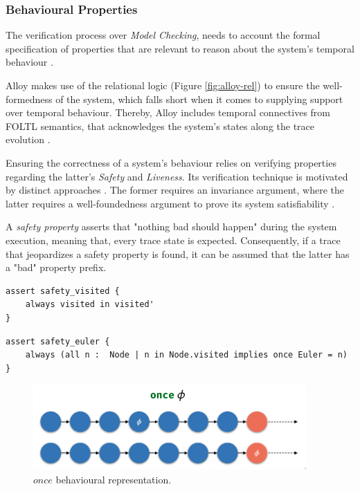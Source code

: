 \subsubsection{Behavioural Properties}

The verification process over \textit{Model Checking}, needs to account the formal specification of properties that are relevant to reason about the system's temporal behaviour \cite{baier2008principles} .

Alloy makes use of the relational logic (Figure \ref{fig:alloy-rel}) to ensure the well-formedness of the system, which falls short when it comes to supplying support over temporal behaviour. Thereby, Alloy includes temporal connectives from FOLTL semantics, that acknowledges the system's states along the trace evolution \cite{lwspecification, alloy-6, 9341085}.

Ensuring the correctness of a system's behaviour relies on verifying properties regarding the latter's \textit{Safety} and \textit{Liveness}. Its verification technique is motivated by distinct approaches \cite{kindler1994safety}. The former requires an invariance argument, where the latter requires a well-foundedness argument to prove its system satisfiability \cite{alpern1987recognizing}.

A \textit{safety property} asserts that "nothing bad should happen" during the system execution, meaning that, every trace state is expected. Consequently, if a trace that jeopardizes a safety property is found, it can be assumed that the latter has a "bad" property prefix. 

\begin{lstlisting}[title={\textit{Safety Property}: The relation visited can only evolve through time.}, otherkeywords = {always, assert, module, set, fact, iden, no, in, \=, \*, \+, \~, \-\>, \&, '}, floatplacement=H]
assert safety_visited {
    always visited in visited'
} 
\end{lstlisting}

\begin{lstlisting}[title={\textit{Safety Property}: If a node is visited, then once \textit{Euler} was 'inside' it.}, otherkeywords = {always, assert, module, set, fact, iden, no, in, \=, \*, \+, \~, \-\>, \&, all, \:, \., implies, once}, floatplacement=H]
assert safety_euler {
    always (all n :  Node | n in Node.visited implies once Euler = n)
} 
\end{lstlisting}

\begin{figure}[H]
    \centering
    \includegraphics[width=0.6\linewidth]{images/alloy_once.png}
    \caption{$once$ behavioural representation.}
    \label{fig:alloy-once}
\end{figure}

